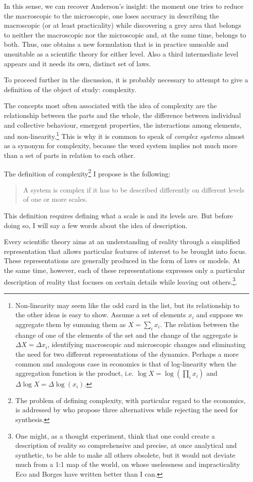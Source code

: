 \documentclass[a4paper, headings=standardclasses]{scrartcl}
\begin{document}
In this sense, we can recover Anderson's insight: the moment one tries to reduce the macroscopic to the microscopic, one loses accuracy in describing the macroscopic (or at least practicality) while discovering a grey area that belongs to neither the macroscopic nor the microscopic and, at the same time, belongs to both.
Thus, one obtains a new formulation that is in practice unusable and unsuitable as a scientific theory for either level. Also a third intermediate level appears and it needs its own, distinct set of laws.

To proceed further in the discussion, it is probably necessary to attempt to give a definition of the object of study: complexity.

The concepts most often associated with the idea of complexity are the relationship between the parts and the whole, the difference between individual and collective behaviour, emergent properties, the interactions among elements, and non-linearity.\footnote{Non-linearity may seem like the odd card in the list, but its relationship to the other ideas is easy to show. Assume a set of elements ${x_i}$ and suppose we aggregate them by summing them as $X=\sum_i x_i$. The relation between the change of one of the elements of the set and the change of the aggregate is $\Delta X=\Delta x_i$, identifying macroscopic and microscopic changes and eliminating the need for two different representations of the dynamics. Perhaps a more common and analogous case in economics is that of log-linearity when the aggregation function is the product, i.e. $\log X = \log(\prod_i x_i)$ and $\Delta \log X=\Delta\log(x_i)$.} This is why it is common to speak of \textit{complex systems} almost as a synonym for complexity, because the word system implies not much more than a set of parts in relation to each other.

The definition of complexity\footnote{The problem of defining complexity, with particular regard to the economics, is addressed by \textcite[§3][]{holt2011} who propose three alternatives while rejecting the need for synthesis.} I propose is the following:
\begin{quote}
	A system is complex if it has to be described differently on different levels of one or more scales.
\end{quote}

This definition requires defining what a scale is and its levels are. But before doing so, I will say a few words about the idea of description.

Every scientific theory aims at an understanding of reality through a simplified representation that allows particular features of interest to be brought into focus. These representations are generally produced in the form of laws or models.
At the same time, however, each of these representations expresses only a particular description of reality that focuses on certain details while leaving out others.\footnote{One might, as a thought experiment, think that one could create a description of reality so comprehensive and precise, at once analytical and synthetic, to be able to make all others obsolete, but it would not deviate much from a 1:1 map of the world, on whose uselessness and impracticality Eco and Borges have written better than I can.}.
\end{document}
